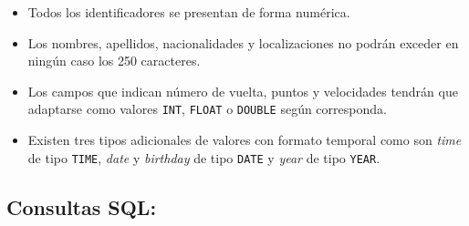 \documentclass{db-practice}
\begin{document}
\begin{itemize}
    \item Todos los identificadores se presentan de forma numérica.
    \item Los nombres, apellidos, nacionalidades y localizaciones no podrán exceder en ningún caso los 250 caracteres.
    \item Los campos que indican número de vuelta, puntos y velocidades tendrán que adaptarse como valores \texttt{INT}, \texttt{FLOAT} o \texttt{DOUBLE} según corresponda.
    \item Existen tres tipos adicionales de valores con formato temporal como son \textit{time} de tipo \texttt{TIME}, \textit{date} y \textit{birthday} de tipo \texttt{DATE} y \textit{year} de tipo \texttt{YEAR}.
\end{itemize}

\subsection*{Consultas SQL:}
\end{document}

